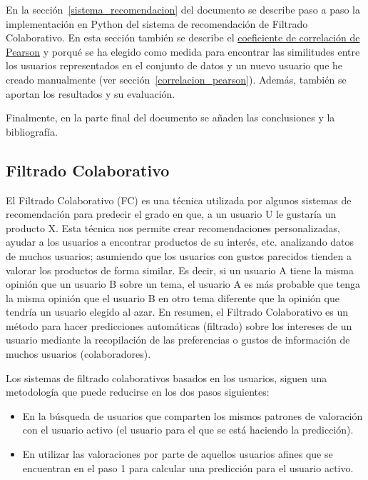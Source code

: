 \documentclass{uimppracticas}
\begin{document}
En la sección~\ref{sistema_recomendacion} del documento se describe paso a paso la implementación en Python del sistema de recomendación de Filtrado Colaborativo. En esta sección también se describe el \href{https://es.wikipedia.org/wiki/Coeficiente_de_correlaci\%C3\%B3n_de_Pearson}{coeficiente de correlación de Pearson} y porqué se ha elegido como medida para encontrar las similitudes entre los usuarios representados en el conjunto de datos y un nuevo usuario que he creado manualmente (ver sección~\ref{correlacion_pearson}). Además, también se aportan los resultados y su evaluación.

Finalmente, en la parte final del documento se añaden las conclusiones y la bibliografía.

\subsection{Filtrado Colaborativo}\label{filtro_colaborativo}

El Filtrado Colaborativo (FC) es una técnica utilizada por algunos sistemas de recomendación para predecir el grado en que, a un usuario U le gustaría un producto X. Esta técnica nos permite crear recomendaciones personalizadas, ayudar a los usuarios a encontrar productos de su interés, etc. analizando datos de muchos usuarios; asumiendo que los usuarios con gustos parecidos tienden a valorar los productos de forma similar. Es decir, si un usuario A tiene la misma opinión que un usuario B sobre un tema, el usuario A es más probable que tenga la misma opinión que el usuario B en otro tema diferente que la opinión que tendría un usuario elegido al azar. En resumen, el Filtrado Colaborativo es un método para hacer predicciones automáticas (filtrado) sobre los intereses de un usuario mediante la recopilación de las preferencias o gustos de información de muchos usuarios (colaboradores). 

Los sistemas de filtrado colaborativos basados en los usuarios, siguen una metodología que puede reducirse en los dos pasos siguientes:

\begin{itemize}
	\item En la búsqueda de usuarios que comparten los mismos patrones de valoración con el usuario activo (el usuario para el que se está haciendo la predicción).
	\item En utilizar las valoraciones por parte de aquellos usuarios afines que se encuentran en el paso 1 para calcular una predicción para el usuario activo.
\end{itemize}
\end{document}
